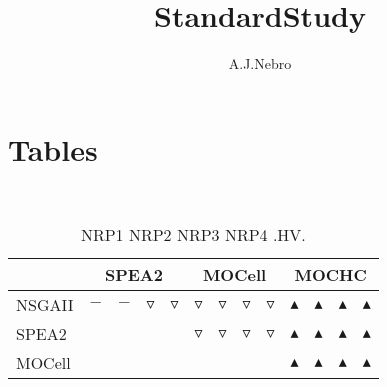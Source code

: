 \documentclass{article}
\title{StandardStudy}
\author{A.J.Nebro}
\begin{document}
\maketitle
\section{Tables}
\
\begin{table}
\caption{
NRP1 NRP2 NRP3 NRP4 
.HV.}
\label{Table:
NRP1 NRP2 NRP3 NRP4 
.HV.}
\centering
\begin{scriptsize}
\begin{tabular}{
| l | p{0.15cm }p{0.15cm }p{0.15cm }p{0.15cm } | p{0.15cm }p{0.15cm }p{0.15cm }p{0.15cm } | p{0.15cm }p{0.15cm }p{0.15cm }p{0.15cm } | 
}
\hline \multicolumn{1}{|c|}{} & \multicolumn{4}{c|}{SPEA2} & \multicolumn{4}{c|}{MOCell} & \multicolumn{4}{c|}{MOCHC} \\
\hline 
NSGAII
 & 
$-$
&
$-$
&
$\triangledown$
&
$\triangledown$
 & 
$\triangledown$
&
$\triangledown$
&
$\triangledown$
&
$\triangledown$
 & 
$\blacktriangle$
&
$\blacktriangle$
&
$\blacktriangle$
&
$\blacktriangle$
 \\ 
SPEA2
 & 
  
&
  
&
  
&
  
 & 
$\triangledown$
&
$\triangledown$
&
$\triangledown$
&
$\triangledown$
 & 
$\blacktriangle$
&
$\blacktriangle$
&
$\blacktriangle$
&
$\blacktriangle$
 \\ 
MOCell
 & 
 
&
 
&
 
&
 
 & 
  
&
  
&
  
&
  
 & 
$\blacktriangle$
&
$\blacktriangle$
&
$\blacktriangle$
&
$\blacktriangle$
 \\ 
\hline
\end{tabular}
\end{scriptsize}
\end{table}
\end{document}
